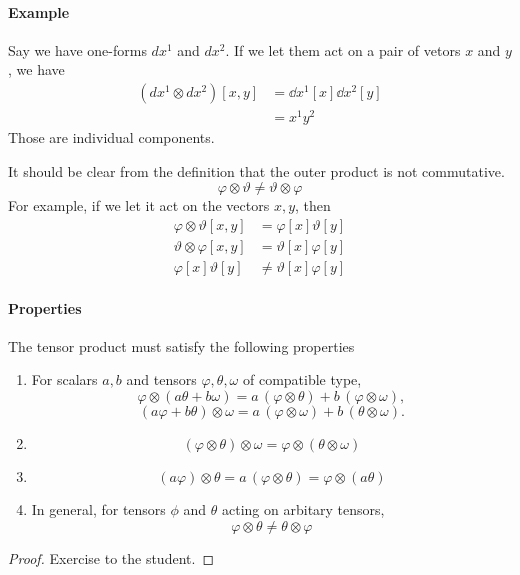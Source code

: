 	\paragraph{Example}

	Say we have one-forms $dx^1$ and $dx^2$. If we let them act on a pair 
	of vetors $x$ and $y$, we have
	\begin{align*}
		(dx^1\otimes dx^2) [x,y] &= \dd{x}^1[x]\dd{x^2}[y] \\
		&=x^1 y^2
	\end{align*}
	Those are individual components.
	
	It should be clear from the definition that the outer product is
	not commutative.
	\[
		\varphi\otimes\vartheta 
		\neq 
		\vartheta\otimes\varphi
	\]
	For example, if we let it act on the vectors $x,y$, then
	\begin{align*}
		\varphi\otimes\vartheta[x,y] &=
		\varphi[x]\vartheta[y]\\
		\vartheta\otimes\varphi[x,y]&=
		\vartheta[x]\varphi[y]\\
		\varphi[x]\vartheta[y]&\neq
		\vartheta[x]\varphi[y]
	\end{align*}
	\paragraph{Properties} The tensor product must satisfy the following 
	properties
	\begin{enumerate}[(1)]
		\item {}

			For scalars $a, b$ and tensors
			  $\varphi, \theta, \omega$ of compatible type,
			  \[
				  \varphi \otimes (a\theta + b\omega)
				  = a\,(\varphi \otimes \theta) + b\,(\varphi \otimes \omega),
			  \]
			  \[
				  (a\varphi + b\theta) \otimes \omega
				  = a\,(\varphi \otimes \omega) + b\,(\theta \otimes \omega).
			  \]
		\item {}

			\[(\varphi \otimes \theta) \otimes \omega
			= \varphi \otimes (\theta \otimes \omega)\]
		\item {}

			\[(a\varphi) \otimes \theta
			   = a\,(\varphi \otimes \theta)
		   = \varphi \otimes (a\theta)\]
		\item {}
			
			In general, for tensors $\phi$ and $\theta$ acting on arbitary tensors,
			\[\varphi \otimes \theta \neq \theta \otimes \varphi\]
	\end{enumerate}
	\begin{proof}
	   Exercise to the student. 
	\end{proof}

